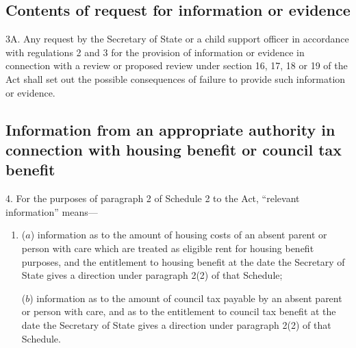 \documentclass[a4paper,12pt]{article}
\begin{document}
\subsection[3A. Contents of request for information or evidence]{Contents of request for information or evidence}

3A.  Any request by the Secretary of State or a child support officer in accordance with regulations 2 and 3 for the provision of information or evidence in connection with a review or proposed review under section 16, 17, 18 or 19 of the Act shall set out the possible consequences of failure to provide such information or evidence.


\subsection[4. Information from an appropriate authority in connection with housing benefit or council tax benefit]{Information from an appropriate authority in connection with housing benefit or council tax benefit}

4.  For the purposes of paragraph 2 of Schedule 2 to the Act, “relevant information” means—
\begin{enumerate}\item[]
($a$) information as to the amount of housing costs of an absent parent or person with care which are treated as eligible rent for housing benefit purposes, and the entitlement to housing benefit at the date the Secretary of State gives a direction under paragraph 2(2) of that Schedule;

($b$) information as to the amount of council tax payable by an absent parent or person with care, and as to the entitlement to council tax benefit at the date the Secretary of State gives a direction under paragraph 2(2) of that Schedule.
\end{enumerate}

%
\end{document}
